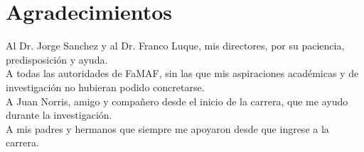 \newpage
\section*{Agradecimientos}

	\begin{minipage}{0.9\textwidth}
	Al Dr. Jorge Sanchez y al Dr. Franco Luque, mis directores, por su paciencia, predisposición y ayuda.\\
	A todas las autoridades de FaMAF, sin las que mis aspiraciones académicas y de investigación no hubieran podido concretarse.	\\
	A Juan Norris, amigo y compañero desde el inicio de la carrera, que me ayudo durante la investigación. \\
    A mis padres y hermanos que siempre me apoyaron desde que ingrese a la carrera.
	\end{minipage}
